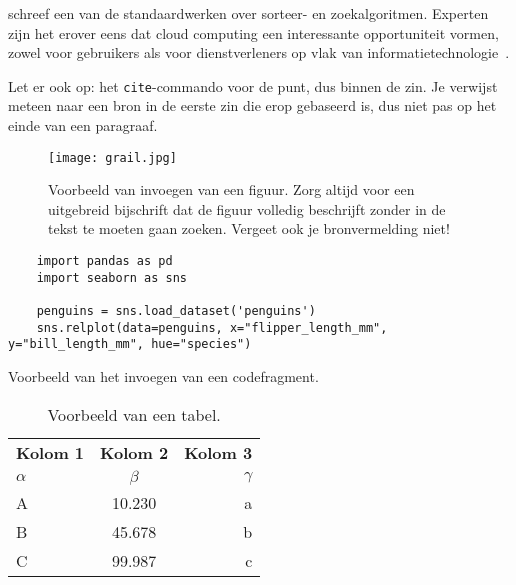 \textcite{Knuth1998} schreef een van de standaardwerken over sorteer- en zoekalgoritmen. Experten zijn het erover eens dat cloud computing een interessante opportuniteit vormen, zowel voor gebruikers als voor dienstverleners op vlak van informatietechnologie~\autocite{Creeger2009}.

Let er ook op: het \texttt{cite}-commando voor de punt, dus binnen de zin. Je verwijst meteen naar een bron in de eerste zin die erop gebaseerd is, dus niet pas op het einde van een paragraaf.

\begin{figure}
  \centering
  \texttt{[image: grail.jpg]}
  \caption[Voorbeeld figuur.]{\label{fig:grail}Voorbeeld van invoegen van een figuur. Zorg altijd voor een uitgebreid bijschrift dat de figuur volledig beschrijft zonder in de tekst te moeten gaan zoeken. Vergeet ook je bronvermelding niet!}
\end{figure}

\begin{listing}
  \begin{verbatim}
    import pandas as pd
    import seaborn as sns

    penguins = sns.load_dataset('penguins')
    sns.relplot(data=penguins, x="flipper_length_mm", y="bill_length_mm", hue="species")
  \end{verbatim}
  \caption[Voorbeeld codefragment]{Voorbeeld van het invoegen van een codefragment.}
\end{listing}

\lipsum[7-20]

\begin{table}
  \centering
  \begin{tabular}{lcr}
    \toprule
    \textbf{Kolom 1} & \textbf{Kolom 2} & \textbf{Kolom 3} \\
    $\alpha$         & $\beta$          & $\gamma$         \\
    \midrule
    A                & 10.230           & a                \\
    B                & 45.678           & b                \\
    C                & 99.987           & c                \\
    \bottomrule
  \end{tabular}
  \caption[Voorbeeld tabel]{\label{tab:example}Voorbeeld van een tabel.}
\end{table}

